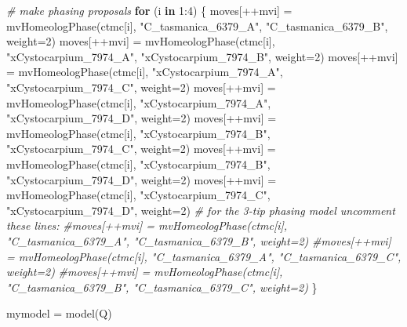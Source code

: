 \documentclass[
]{book}
\newenvironment{Shaded}{\begin{snugshade}}{\end{snugshade}}
\newcommand{\AttributeTok}[1]{\textcolor[rgb]{0.77,0.63,0.00}{#1}}
\newcommand{\CommentTok}[1]{\textcolor[rgb]{0.56,0.35,0.01}{\textit{#1}}}
\newcommand{\ControlFlowTok}[1]{\textcolor[rgb]{0.13,0.29,0.53}{\textbf{#1}}}
\newcommand{\DecValTok}[1]{\textcolor[rgb]{0.00,0.00,0.81}{#1}}
\newcommand{\FunctionTok}[1]{\textcolor[rgb]{0.00,0.00,0.00}{#1}}
\newcommand{\NormalTok}[1]{#1}
\newcommand{\OtherTok}[1]{\textcolor[rgb]{0.56,0.35,0.01}{#1}}
\newcommand{\SpecialCharTok}[1]{\textcolor[rgb]{0.00,0.00,0.00}{#1}}
\newcommand{\StringTok}[1]{\textcolor[rgb]{0.31,0.60,0.02}{#1}}
\begin{document}
\begin{Shaded}
\begin{Highlighting}[]
\CommentTok{\# make phasing proposals}
\ControlFlowTok{for}\NormalTok{ (i }\ControlFlowTok{in} \DecValTok{1}\SpecialCharTok{:}\DecValTok{4}\NormalTok{) \{}
\NormalTok{    moves[}\SpecialCharTok{++}\NormalTok{mvi] }\OtherTok{=} \FunctionTok{mvHomeologPhase}\NormalTok{(ctmc[i], }\StringTok{"C\_tasmanica\_6379\_A"}\NormalTok{, }\StringTok{"C\_tasmanica\_6379\_B"}\NormalTok{, }\AttributeTok{weight=}\DecValTok{2}\NormalTok{)}
\NormalTok{    moves[}\SpecialCharTok{++}\NormalTok{mvi] }\OtherTok{=} \FunctionTok{mvHomeologPhase}\NormalTok{(ctmc[i], }\StringTok{"xCystocarpium\_7974\_A"}\NormalTok{, }\StringTok{"xCystocarpium\_7974\_B"}\NormalTok{, }\AttributeTok{weight=}\DecValTok{2}\NormalTok{)}
\NormalTok{    moves[}\SpecialCharTok{++}\NormalTok{mvi] }\OtherTok{=} \FunctionTok{mvHomeologPhase}\NormalTok{(ctmc[i], }\StringTok{"xCystocarpium\_7974\_A"}\NormalTok{, }\StringTok{"xCystocarpium\_7974\_C"}\NormalTok{, }\AttributeTok{weight=}\DecValTok{2}\NormalTok{)}
\NormalTok{    moves[}\SpecialCharTok{++}\NormalTok{mvi] }\OtherTok{=} \FunctionTok{mvHomeologPhase}\NormalTok{(ctmc[i], }\StringTok{"xCystocarpium\_7974\_A"}\NormalTok{, }\StringTok{"xCystocarpium\_7974\_D"}\NormalTok{, }\AttributeTok{weight=}\DecValTok{2}\NormalTok{)}
\NormalTok{    moves[}\SpecialCharTok{++}\NormalTok{mvi] }\OtherTok{=} \FunctionTok{mvHomeologPhase}\NormalTok{(ctmc[i], }\StringTok{"xCystocarpium\_7974\_B"}\NormalTok{, }\StringTok{"xCystocarpium\_7974\_C"}\NormalTok{, }\AttributeTok{weight=}\DecValTok{2}\NormalTok{)}
\NormalTok{    moves[}\SpecialCharTok{++}\NormalTok{mvi] }\OtherTok{=} \FunctionTok{mvHomeologPhase}\NormalTok{(ctmc[i], }\StringTok{"xCystocarpium\_7974\_B"}\NormalTok{, }\StringTok{"xCystocarpium\_7974\_D"}\NormalTok{, }\AttributeTok{weight=}\DecValTok{2}\NormalTok{)}
\NormalTok{    moves[}\SpecialCharTok{++}\NormalTok{mvi] }\OtherTok{=} \FunctionTok{mvHomeologPhase}\NormalTok{(ctmc[i], }\StringTok{"xCystocarpium\_7974\_C"}\NormalTok{, }\StringTok{"xCystocarpium\_7974\_D"}\NormalTok{, }\AttributeTok{weight=}\DecValTok{2}\NormalTok{)}
    \CommentTok{\# for the 3{-}tip phasing model uncomment these lines:}
    \CommentTok{\#moves[++mvi] = mvHomeologPhase(ctmc[i], "C\_tasmanica\_6379\_A", "C\_tasmanica\_6379\_B", weight=2)}
    \CommentTok{\#moves[++mvi] = mvHomeologPhase(ctmc[i], "C\_tasmanica\_6379\_A", "C\_tasmanica\_6379\_C", weight=2)}
    \CommentTok{\#moves[++mvi] = mvHomeologPhase(ctmc[i], "C\_tasmanica\_6379\_B", "C\_tasmanica\_6379\_C", weight=2)}
\NormalTok{\}}

\NormalTok{mymodel }\OtherTok{=} \FunctionTok{model}\NormalTok{(Q)}



\end{Highlighting}
\end{Shaded}
\end{document}
